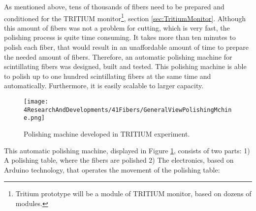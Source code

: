 As mentioned above, tens of thousands of fibers need to be prepared and conditioned for the TRITIUM monitor\footnote{Tritium prototype will be a module of TRITIUM monitor, based on dozens of modules.}, section \ref{sec:TritiumMonitor}. Although this amount of fibers was not a problem for cutting, which is very fast, the polishing process is quite time consuming. It takes more than ten minutes to polish each fiber, that would result in an unaffordable amount of time to prepare the needed amount of fibers. Therefore, an automatic polishing machine for scintillating fibers was designed, built and tested. This polishing machine is able to polish up to one hundred scintillating fibers at the same time and automatically. Furthermore, it is easily scalable to larger capacity.


\begin{figure}[h]
\centering
\texttt{[image: 4ResearchAndDevelopments/41Fibers/GeneralViewPolishingMchine.png]}
\caption{Polishing machine developed in TRITIUM experiment.\label{fig:GeneralViewPolishingMachine}}
\end{figure}

This automatic polishing machine, displayed in Figure \ref{fig:GeneralViewPolishingMachine}, consists of two parts: 1) A polishing table, where the fibers are polished 2) The electronics, based on Arduino technology, that operates the movement of the polishing table:

